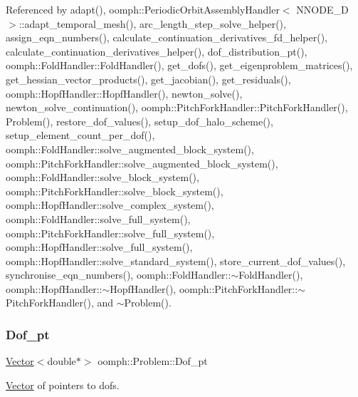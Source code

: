 Referenced by adapt(), oomph\+::\+Periodic\+Orbit\+Assembly\+Handler$<$ N\+N\+O\+D\+E\+\_\+D $>$\+::adapt\+\_\+temporal\+\_\+mesh(), arc\+\_\+length\+\_\+step\+\_\+solve\+\_\+helper(), assign\+\_\+eqn\+\_\+numbers(), calculate\+\_\+continuation\+\_\+derivatives\+\_\+fd\+\_\+helper(), calculate\+\_\+continuation\+\_\+derivatives\+\_\+helper(), dof\+\_\+distribution\+\_\+pt(), oomph\+::\+Fold\+Handler\+::\+Fold\+Handler(), get\+\_\+dofs(), get\+\_\+eigenproblem\+\_\+matrices(), get\+\_\+hessian\+\_\+vector\+\_\+products(), get\+\_\+jacobian(), get\+\_\+residuals(), oomph\+::\+Hopf\+Handler\+::\+Hopf\+Handler(), newton\+\_\+solve(), newton\+\_\+solve\+\_\+continuation(), oomph\+::\+Pitch\+Fork\+Handler\+::\+Pitch\+Fork\+Handler(), Problem(), restore\+\_\+dof\+\_\+values(), setup\+\_\+dof\+\_\+halo\+\_\+scheme(), setup\+\_\+element\+\_\+count\+\_\+per\+\_\+dof(), oomph\+::\+Fold\+Handler\+::solve\+\_\+augmented\+\_\+block\+\_\+system(), oomph\+::\+Pitch\+Fork\+Handler\+::solve\+\_\+augmented\+\_\+block\+\_\+system(), oomph\+::\+Fold\+Handler\+::solve\+\_\+block\+\_\+system(), oomph\+::\+Pitch\+Fork\+Handler\+::solve\+\_\+block\+\_\+system(), oomph\+::\+Hopf\+Handler\+::solve\+\_\+complex\+\_\+system(), oomph\+::\+Fold\+Handler\+::solve\+\_\+full\+\_\+system(), oomph\+::\+Pitch\+Fork\+Handler\+::solve\+\_\+full\+\_\+system(), oomph\+::\+Hopf\+Handler\+::solve\+\_\+full\+\_\+system(), oomph\+::\+Hopf\+Handler\+::solve\+\_\+standard\+\_\+system(), store\+\_\+current\+\_\+dof\+\_\+values(), synchronise\+\_\+eqn\+\_\+numbers(), oomph\+::\+Fold\+Handler\+::$\sim$\+Fold\+Handler(), oomph\+::\+Hopf\+Handler\+::$\sim$\+Hopf\+Handler(), oomph\+::\+Pitch\+Fork\+Handler\+::$\sim$\+Pitch\+Fork\+Handler(), and $\sim$\+Problem().

\mbox{\label{classoomph_1_1Problem_aa9e4cfff7e1dc295036b0e58bc11ae75}} 
\subsubsection{\texorpdfstring{Dof\+\_\+pt}{Dof\_pt}}
{\footnotesize\ttfamily \hyperlink{classoomph_1_1Vector}{Vector}$<$double$\ast$$>$ oomph\+::\+Problem\+::\+Dof\+\_\+pt\hspace{0.3cm}{\ttfamily [protected]}}



\hyperlink{classoomph_1_1Vector}{Vector} of pointers to dofs. 



